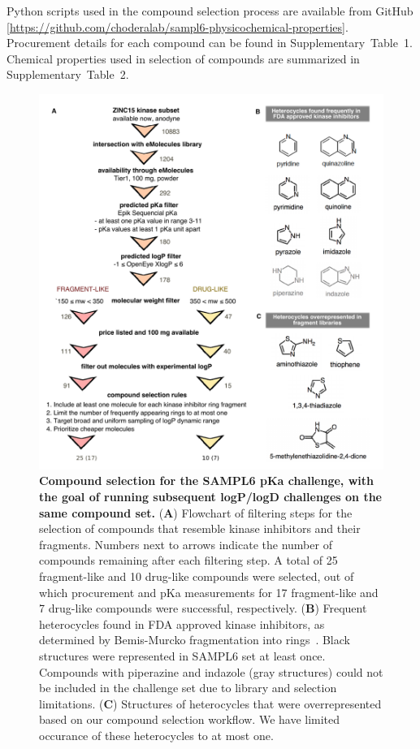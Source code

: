 \documentclass[9pt,lineno]{elife}
\begin{document}
Python scripts used in the compound selection process are available from GitHub [\url{https://github.com/choderalab/sampl6-physicochemical-properties}]. Procurement details for each compound can be found in Supplementary~Table~1. Chemical properties used in selection of compounds are summarized in Supplementary~Table~2.

\begin{figure}
\begin{center}
\includegraphics[width=0.95\linewidth]{figures/compound_selection_figure.pdf}
\caption{{\bf Compound selection for the SAMPL6 pKa challenge, with the goal of running subsequent logP/logD challenges on the same compound set.} 
(\textbf{A}) Flowchart of filtering steps for the selection of compounds that resemble kinase inhibitors and their fragments. 
Numbers next to arrows indicate the number of compounds remaining after each filtering step. 
A total of 25 fragment-like and 10 drug-like compounds were selected, out of which procurement and pKa measurements for 17 fragment-like and 7 drug-like compounds were successful, respectively. 
(\textbf{B}) Frequent heterocycles found in FDA approved kinase inhibitors, as determined by Bemis-Murcko fragmentation into rings~\citep{bemis_properties_1996}. 
Black structures were represented in SAMPL6 set at least once. 
Compounds with piperazine and indazole (gray structures) could not be included in the challenge set due to library and selection limitations.  
(\textbf{C}) Structures of heterocycles that were overrepresented based on our compound selection workflow. We have limited occurance of these heterocycles to at most one.
}
\label{fig:compound_selection_figure}
\end{center}
\end{figure}
\end{document}
